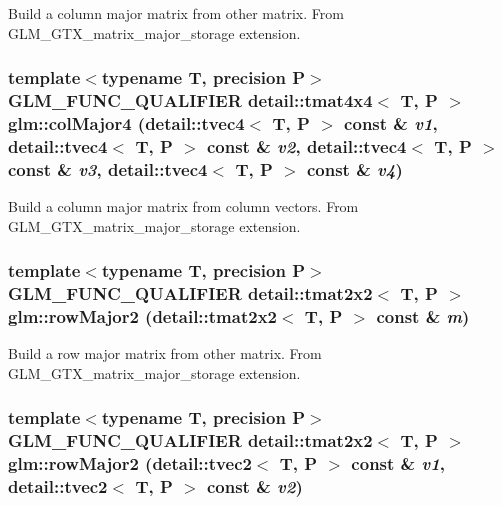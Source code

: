 Build a column major matrix from other matrix. From GLM\_\-GTX\_\-matrix\_\-major\_\-storage extension. \hypertarget{group__gtx__matrix__major__storage_g585113d3d54f337093700210a8103f6d}{
\subsubsection[colMajor4]{\setlength{\rightskip}{0pt plus 5cm}template$<$typename T, precision P$>$ GLM\_\-FUNC\_\-QUALIFIER detail::tmat4x4$<$ T, P $>$ glm::colMajor4 (detail::tvec4$<$ T, P $>$ const \& {\em v1}, \/  detail::tvec4$<$ T, P $>$ const \& {\em v2}, \/  detail::tvec4$<$ T, P $>$ const \& {\em v3}, \/  detail::tvec4$<$ T, P $>$ const \& {\em v4})}}
\label{group__gtx__matrix__major__storage_g585113d3d54f337093700210a8103f6d}


Build a column major matrix from column vectors. From GLM\_\-GTX\_\-matrix\_\-major\_\-storage extension. \hypertarget{group__gtx__matrix__major__storage_g9712bed19f3aa3776b59756adf3b56e2}{
\subsubsection[rowMajor2]{\setlength{\rightskip}{0pt plus 5cm}template$<$typename T, precision P$>$ GLM\_\-FUNC\_\-QUALIFIER detail::tmat2x2$<$ T, P $>$ glm::rowMajor2 (detail::tmat2x2$<$ T, P $>$ const \& {\em m})}}
\label{group__gtx__matrix__major__storage_g9712bed19f3aa3776b59756adf3b56e2}


Build a row major matrix from other matrix. From GLM\_\-GTX\_\-matrix\_\-major\_\-storage extension. \hypertarget{group__gtx__matrix__major__storage_g9d48983329e8a94489982067dfe8f5cf}{
\subsubsection[rowMajor2]{\setlength{\rightskip}{0pt plus 5cm}template$<$typename T, precision P$>$ GLM\_\-FUNC\_\-QUALIFIER detail::tmat2x2$<$ T, P $>$ glm::rowMajor2 (detail::tvec2$<$ T, P $>$ const \& {\em v1}, \/  detail::tvec2$<$ T, P $>$ const \& {\em v2})}}
\label{group__gtx__matrix__major__storage_g9d48983329e8a94489982067dfe8f5cf}


